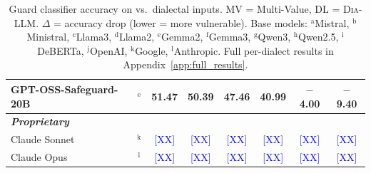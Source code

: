 \begin{table}[t]
\begin{tabular}{lccccccc}
GPT-OSS-Safeguard-20B & $^\text{e}$ & 51.47 & 50.39 & 47.46 & 40.99 & $-$4.00 & $-$9.40 \\
\midrule
\multicolumn{8}{l}{\textbf{\textit{Proprietary}}} \\
Claude Sonnet & $^\text{k}$ & \textcolor{blue}{[XX]} & \textcolor{blue}{[XX]} & \textcolor{blue}{[XX]} & \textcolor{blue}{[XX]} & \textcolor{blue}{[XX]} & \textcolor{blue}{[XX]} \\
Claude Opus   & $^\text{l}$ & \textcolor{blue}{[XX]} & \textcolor{blue}{[XX]} & \textcolor{blue}{[XX]} & \textcolor{blue}{[XX]} & \textcolor{blue}{[XX]} & \textcolor{blue}{[XX]} \\
\bottomrule
\end{tabular}
\caption{Guard classifier accuracy on \sae{} vs.\ dialectal inputs. \textsc{MV} = Multi-Value, \textsc{DL} = \textsc{Dia-LLM}. $\Delta$ = accuracy drop (lower = more vulnerable). Base models: $^\text{a}$Mistral, $^\text{b}$Ministral, $^\text{c}$Llama3, $^\text{d}$Llama2, $^\text{e}$Gemma2, $^\text{f}$Gemma3, $^\text{g}$Qwen3, $^\text{h}$Qwen2.5, $^\text{i}$DeBERTa, $^\text{j}$OpenAI, $^\text{k}$Google, $^\text{l}$Anthropic. Full per-dialect results in Appendix~\ref{app:full_results}.}
\label{tab:guard_results}
\end{table}
